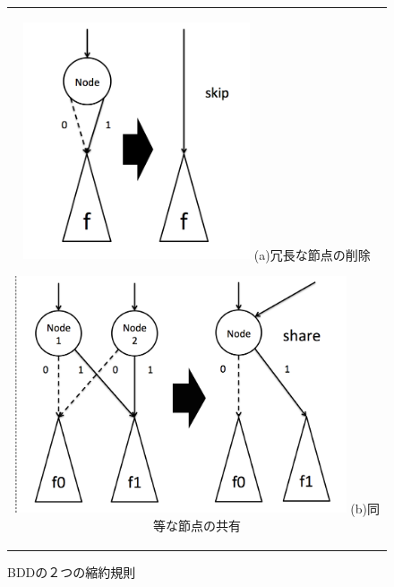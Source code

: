 \documentclass[12pt,twoside, fleqn]{ujbook}
\begin{document}
	\begin{figure}[htbp]
	\begin{center}
	\begin{tabular}{c}
		\begin{minipage}{0.4\hsize}
			\begin{center}
			\includegraphics [clip, height=7cm]{./img/bddrule-1.png}
			\hspace{1.6cm} (a)冗長な節点の削除
			\end{center}
		\end{minipage}

		\begin{minipage}{0.6\hsize}
			\begin{center}
			\includegraphics [clip, height=7cm]{./img/bddrule-2.png}
			\hspace{1.6cm} (b)同等な節点の共有
			\end{center}
		\end{minipage}
	\end{tabular}
	\caption{BDDの２つの縮約規則}
	\label{fig:bddrule}
	\end{center}
	\end{figure}
\end{document}
